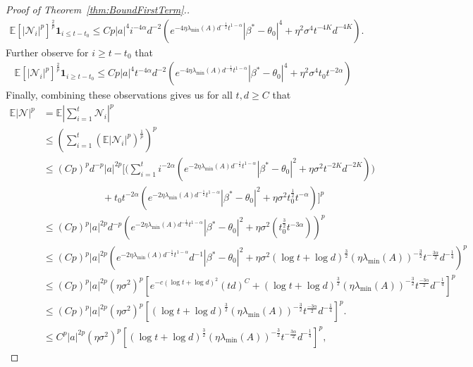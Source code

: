 \documentclass[11pt, reqno,english]{amsart}
\begin{document}
\begin{proof}[Proof of Theorem~\ref{thm:BoundFirstTerm}.]
\begin{align*}
\mathbb{E}[|\mathcal N_i|^p]^{\frac{2}{p}}\mathbf{1}_{i  \leq t-t_0} \leq Cp|a|^4 i^{-4\alpha} d^{-2}(e^{-4\eta \lambda_{\min}(A)d^{-\frac{1}{2}}t^{1-\alpha}}|\beta^* - \theta_0|^4 + \eta^2 \sigma^4 t^{-4K}d^{-4K}).
\end{align*}
Further observe for $i \geq t - t_0$ that 
\begin{align*}
\mathbb{E}[|\mathcal N_i|^p]^{\frac{2}{p}}\mathbf{1}_{i \geq t-t_0} \leq Cp|a|^4 t^{-4\alpha}d^{-2} (e^{-4\eta \lambda_{\min}(A)d^{-\frac{1}{2}}t^{1-\alpha}}|\beta^* - \theta_0|^4 + \eta^2 \sigma^4 t_0 t^{-2\alpha})
\end{align*}
Finally,  combining these observations gives us for all $t,d \geq C$ that
\begin{align*}
\mathbb{E}|\mathcal N|^p &= \mathbb{E}|\sum_{i = 1}^t \mathcal N_i|^p
\\
&\leq (\sum_{i = 1}^t (\mathbb{E}|\mathcal N_i|^p)^{\frac{1}{p}})^p
\\
&\leq (Cp)^pd^{-p}|a|^{2p} \bigg[\bigg(\sum_{i = 1}^t i^{-2\alpha} (e^{-2\eta \lambda_{\min}(A)d^{-\frac{1}{2}}t^{1-\alpha}}|\beta^* - \theta_0|^2 + \eta \sigma^2 t^{-2K}d^{-2K})\bigg) 
\\
&\quad \quad \quad \quad\quad \quad  + t_0 t^{-2\alpha} (e^{-2\eta \lambda_{\min}(A)d^{-\frac{1}{2}}t^{1-\alpha}} |\beta^* - \theta_0|^2 + \eta \sigma^2 t_0^{\frac{1}{2}}t^{-\alpha})\bigg]^p 
\\
&\leq (Cp)^p|a|^{2p} d^{-p}(e^{-2\eta \lambda_{\min}(A)d^{-\frac{1}{2}}t^{1-\alpha}}|\beta^* - \theta_0|^2 + \eta \sigma^2 (t^{\frac{3}{2}}_0t^{-3\alpha}))^p
\\
&\leq (Cp)^p |a|^{2p}(e^{-2\eta \lambda_{\min}(A)d^{-\frac{1}{2}}t^{1-\alpha}}d^{-1}|\beta^* - \theta_0|^2 + \eta \sigma^2 (\log t + \log d)^{\frac{3}{2}}(\eta \lambda_{\min}(A))^{-\frac{3}{2}} t^{-\frac{3\alpha}{2}}d^{-\frac{1}{4}})^p
\\
&\leq (Cp)^p |a|^{2p} (\eta\sigma^2)^p[e^{-c(\log t + \log d)^2} (td)^C+(\log t + \log d)^{\frac{3}{2}} (\eta \lambda_{\min}(A))^{-\frac{3}{2}} t^{\frac{-3\alpha}{2}} d^{-\frac{1}{4}}]^p
\\
&\leq (Cp)^p |a|^{2p} (\eta\sigma^2)^p[(\log t + \log d)^{\frac{3}{2}} (\eta \lambda_{\min}(A))^{-\frac{3}{2}} t^{\frac{-3\alpha}{2}} d^{-\frac{1}{4}}]^p.
\\
&\leq C^p |a|^{2p} (\eta\sigma^2)^p[(\log t + \log d)^{\frac{3}{2}} (\eta \lambda_{\min}(A))^{-\frac{3}{2}} t^{-\frac{3\alpha}{2}} d^{-\frac{1}{4}}]^p,
\end{align*}

\end{proof}
\end{document}
